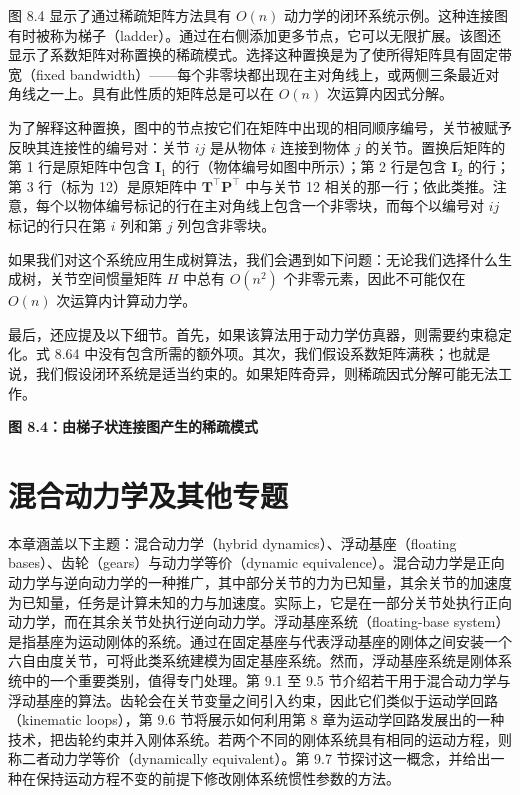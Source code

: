 \documentclass[10pt,a4paper]{book}
\theoremstyle{thmstyle} %
\theoremstyle{defstyle} %
\theoremstyle{prostyle} %
\begin{document}
图 8.4 显示了通过稀疏矩阵方法具有 $O(n)$ 动力学的闭环系统示例。这种连接图有时被称为梯子（ladder）。通过在右侧添加更多节点，它可以无限扩展。该图还显示了系数矩阵对称置换的稀疏模式。选择这种置换是为了使所得矩阵具有固定带宽（fixed bandwidth）——每个非零块都出现在主对角线上，或两侧三条最近对角线之一上。具有此性质的矩阵总是可以在 $O(n)$ 次运算内因式分解。



为了解释这种置换，图中的节点按它们在矩阵中出现的相同顺序编号，关节被赋予反映其连接性的编号对：关节 $ij$ 是从物体 $i$ 连接到物体 $j$ 的关节。置换后矩阵的第 1 行是原矩阵中包含 $\mathbf{I}_1$ 的行（物体编号如图中所示）；第 2 行是包含 $\mathbf{I}_2$ 的行；第 3 行（标为 12）是原矩阵中 $\mathbf{T}^\top\mathbf{P}^\top$ 中与关节 12 相关的那一行；依此类推。注意，每个以物体编号标记的行在主对角线上包含一个非零块，而每个以编号对 $ij$ 标记的行只在第 $i$ 列和第 $j$ 列包含非零块。



如果我们对这个系统应用生成树算法，我们会遇到如下问题：无论我们选择什么生成树，关节空间惯量矩阵 $H$ 中总有 $O(n^2)$ 个非零元素，因此不可能仅在 $O(n)$ 次运算内计算动力学。



最后，还应提及以下细节。首先，如果该算法用于动力学仿真器，则需要约束稳定化。式 8.64 中没有包含所需的额外项。其次，我们假设系数矩阵满秩；也就是说，我们假设闭环系统是适当约束的。如果矩阵奇异，则稀疏因式分解可能无法工作。



\noindent\textbf{图 8.4：由梯子状连接图产生的稀疏模式}





\chapter{混合动力学及其他专题}







本章涵盖以下主题：混合动力学（hybrid dynamics）、浮动基座（floating bases）、齿轮（gears）与动力学等价（dynamic equivalence）。混合动力学是正向动力学与逆向动力学的一种推广，其中部分关节的力为已知量，其余关节的加速度为已知量，任务是计算未知的力与加速度。实际上，它是在一部分关节处执行正向动力学，而在其余关节处执行逆向动力学。浮动基座系统（floating-base system）是指基座为运动刚体的系统。通过在固定基座与代表浮动基座的刚体之间安装一个六自由度关节，可将此类系统建模为固定基座系统。然而，浮动基座系统是刚体系统中的一个重要类别，值得专门处理。第 9.1 至 9.5 节介绍若干用于混合动力学与浮动基座的算法。齿轮会在关节变量之间引入约束，因此它们类似于运动学回路（kinematic loops），第 9.6 节将展示如何利用第 8 章为运动学回路发展出的一种技术，把齿轮约束并入刚体系统。若两个不同的刚体系统具有相同的运动方程，则称二者动力学等价（dynamically equivalent）。第 9.7 节探讨这一概念，并给出一种在保持运动方程不变的前提下修改刚体系统惯性参数的方法。
\end{document}
